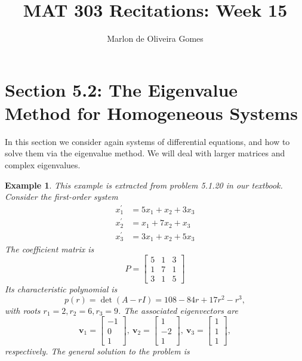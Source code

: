 \documentclass[11pt]{amsart}
\title{MAT 303 Recitations: Week 15}
\author[M. Gomes]{Marlon de Oliveira Gomes}
\newtheorem{example}{Example}
\numberwithin{equation}{section}
\begin{document}
\maketitle


\section*{Section 5.2: The Eigenvalue Method for Homogeneous Systems}

In this section we consider again systems of differential equations, and how to solve them via the eigenvalue method. We will deal with larger matrices and complex eigenvalues. 

\begin{example}
This example is extracted from problem 5.1.20 in our textbook. Consider the first-order system
\begin{align*}
x_{1}^{'} & = 5x_1 + x_2 + 3x_3\\
x_{2}^{'} & = x_1 +7x_2+x_3\\
x_{3}^{'} & = 3x_1+x_2+5x_3
\end{align*}
The coefficient matrix is 
\begin{equation*}
P = 
\begin{bmatrix}
5 & 1 & 3 \\
1 & 7 & 1 \\
3 & 1 & 5
\end{bmatrix}
\end{equation*}
Its characteristic polynomial is 
\begin{equation*}
p(r)=\det(A-rI)= 108 - 84r+17r^2-r^3,
\end{equation*}
with roots $r_1=2, r_2=6, r_3=9$. The associated eigenvectors are 
\begin{equation*}
\mathbf{v}_1 =
\begin{bmatrix}
-1 \\
0 \\
1
\end{bmatrix}
, \ \mathbf{v}_2 =
\begin{bmatrix}
1 \\
-2 \\
1
\end{bmatrix}, \ \mathbf{v}_3 =
\begin{bmatrix}
1 \\
1 \\
1
\end{bmatrix},
\end{equation*}
respectively. The general solution to the problem is 


\end{example}
\end{document}
